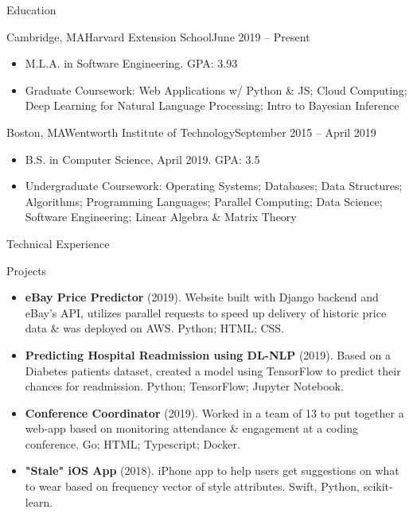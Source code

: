 \documentclass[]{mcdowellcv}
\begin{document}
	\begin{cvsection}{Education}
		\begin{cvsubsection}{Cambridge, MA}{Harvard Extension School}{June 2019 -- Present}
		
			\begin{itemize}
				\item M.L.A. in Software Engineering. GPA: 3.93
				\item Graduate Coursework: Web Applications w/ Python \& JS; Cloud Computing; Deep Learning for Natural Language Processing; Intro to Bayesian Inference
				\end{itemize}
		\end{cvsubsection}
		\begin{cvsubsection}{Boston, MA}{Wentworth Institute of Technology}{September 2015 -- April 2019}
		\vspace{2mm}
			\begin{itemize}
				\item B.S. in Computer Science, April 2019. GPA: 3.5
				\item Undergraduate Coursework: Operating Systems; Databases; Data Structures; Algorithms; Programming Languages; Parallel Computing; Data Science; Software Engineering; Linear Algebra \& Matrix Theory
			\end{itemize}
		\end{cvsubsection}
	\end{cvsection}
	
	\begin{cvsection}{Technical Experience}
		\begin{cvsubsection}{Projects}{}{}
			\begin{itemize}
				\item \textbf{eBay Price Predictor} (2019). Website built with Django backend and eBay's API, utilizes parallel requests to speed up delivery of historic price data \& was deployed on AWS. Python; HTML; CSS.
				\item \textbf{Predicting Hospital Readmission using DL-NLP} (2019). Based on a Diabetes patients dataset, created a model using TensorFlow to predict their chances for readmission. Python; TensorFlow; Jupyter Notebook.
				\item \textbf{Conference Coordinator} (2019). Worked in a team of 13 to put together a web-app based on monitoring attendance \& engagement at a coding conference. Go; HTML; Typescript; Docker.
				\item \textbf{"Stale" iOS App} (2018). iPhone app to help users get suggestions on what to wear based on frequency vector of style attributes. Swift, Python, scikit-learn.
			\end{itemize}
		\end{cvsubsection}
	\end{cvsection}
	
\end{document}
